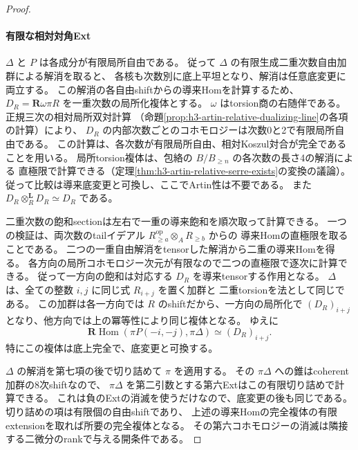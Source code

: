 \begin{proof}
\paragraph{有限な相対対角Ext}
$\Delta$ と $P$ は各成分が有限局所自由である。
従って $\Delta$ の有限生成二重次数自由加群による解消を取ると、
各核も次数別に底上平坦となり、解消は任意底変更に両立する。
この解消の各自由shiftからの導来Homを計算するため、
$D_R=\mathbf R\omega\pi R$ を一重次数の局所化複体とする。
$\omega$ はtorsion商の右随伴である。
正規三次の相対局所双対計算
（命題\ref{prop:h3-artin-relative-dualizing-line}の各項の計算）により、
$D_R$ の内部次数ごとのコホモロジーは次数0と2で有限局所自由である。
この計算は、各次数が有限局所自由、相対Koszul対合が完全であることを用いる。
局所torsion複体は、包絡の $B/B_{\ge n}$ の各次数の長さ4の解消による
直極限で計算できる（定理\ref{thm:h3-artin-relative-serre-exists}の変換の議論）。
従って比較は導来底変更と可換し、ここでArtin性は不要である。
また $D_R\otimes_R^{\mathbf L}D_R\simeq D_R$ である。

二重次数の飽和sectionは左右で一重の導来飽和を順次取って計算できる。
一つの検証は、両次数のtailイデアル
$R^{\mathrm{op}}_{\ge a}\otimes_A R_{\ge b}$ からの
導来Homの直極限を取ることである。
二つの一重自由解消をtensorした解消から二重の導来Homを得る。
各方向の局所コホモロジー次元が有限なので二つの直極限で逐次に計算できる。
従って一方向の飽和は対応する $D_R$ を導来tensorする作用となる。
$\Delta$ は、全ての整数 $i,j$ に同じ式 $R_{i+j}$ を置く加群と
二重torsionを法として同じである。
この加群は各一方向では $R$ のshiftだから、一方向の局所化で
$(D_R)_{i+j}$ となり、他方向では上の冪等性により同じ複体となる。
ゆえに
\[
 \mathbf R\operatorname{Hom}(\pi P(-i,-j),\pi\Delta)
 \simeq (D_R)_{i+j}.
\]
特にこの複体は底上完全で、底変更と可換する。

$\Delta$ の解消を第七項の後で切り詰めて $\pi$ を適用する。
その $\pi\Delta$ への錐はcoherent加群の8次shiftなので、
$\pi\Delta$ を第二引数とする第六Extはこの有限切り詰めで計算できる。
これは負のExtの消滅を使うだけなので、底変更の後も同じである。
切り詰めの項は有限個の自由shiftであり、
上述の導来Homの完全複体の有限extensionを取れば所要の完全複体となる。
その第六コホモロジーの消滅は隣接する二微分のrankで与える開条件である。


\end{proof}
